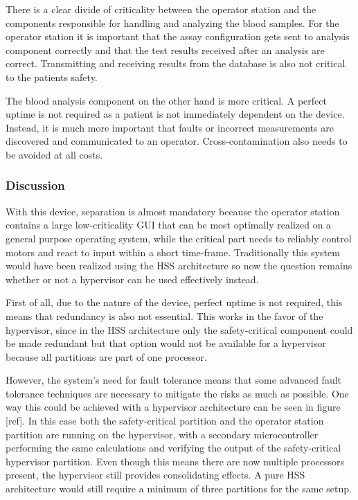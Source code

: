 There is a clear divide of criticality between the operator station and the components responsible for handling and analyzing the blood samples. For the operator station it is important that the assay configuration gets sent to analysis component correctly and that the test results received after an analysis are correct. Transmitting and receiving results from the database is also not critical to the patients safety.

The blood analysis component on the other hand is more critical. A perfect uptime is not required as a patient is not immediately dependent on the device. Instead, it is much more important that faults or incorrect measurements are discovered and communicated to an operator. Cross-contamination also needs to be avoided at all costs.

\subsubsection{Discussion}
With this device, separation is almost mandatory because the operator station contains a large low-criticality \gls{GUI} that can be most optimally realized on a general purpose operating system, while the critical part needs to reliably control motors and react to input within a short time-frame. Traditionally this system would have been realized using the \gls{HSS} architecture so now the question remains whether or not a hypervisor can be used effectively instead.

First of all, due to the nature of the device, perfect uptime is not required, this means that redundancy is also not essential. This works in the favor of the hypervisor, since in the \gls{HSS} architecture only the safety-critical component could be made redundant but that option would not be available for a hypervisor because all partitions are part of one processor. 

However, the system's need for fault tolerance means that some advanced fault tolerance techniques are necessary to mitigate the risks as much as possible. One way this could be achieved with a hypervisor architecture can be seen in figure [ref]. In this case both the safety-critical partition and the operator station partition are running on the hypervisor, with a secondary microcontroller performing the same calculations and verifying the output of the safety-critical hypervisor partition. Even though this means there are now multiple processors present, the hypervisor still provides consolidating effects. A pure \gls{HSS} architecture would still require a minimum of three partitions for the same setup.

